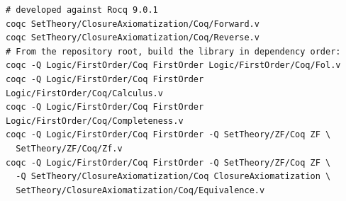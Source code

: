 \documentclass[11pt]{article}
\theoremstyle{plain}
\theoremstyle{definition}
\begin{document}
\begin{lstlisting}[language={}]
# developed against Rocq 9.0.1
coqc SetTheory/ClosureAxiomatization/Coq/Forward.v
coqc SetTheory/ClosureAxiomatization/Coq/Reverse.v
# From the repository root, build the library in dependency order:
coqc -Q Logic/FirstOrder/Coq FirstOrder Logic/FirstOrder/Coq/Fol.v
coqc -Q Logic/FirstOrder/Coq FirstOrder Logic/FirstOrder/Coq/Calculus.v
coqc -Q Logic/FirstOrder/Coq FirstOrder Logic/FirstOrder/Coq/Completeness.v
coqc -Q Logic/FirstOrder/Coq FirstOrder -Q SetTheory/ZF/Coq ZF \
  SetTheory/ZF/Coq/Zf.v
coqc -Q Logic/FirstOrder/Coq FirstOrder -Q SetTheory/ZF/Coq ZF \
  -Q SetTheory/ClosureAxiomatization/Coq ClosureAxiomatization \
  SetTheory/ClosureAxiomatization/Coq/Equivalence.v
\end{lstlisting}
\end{document}
